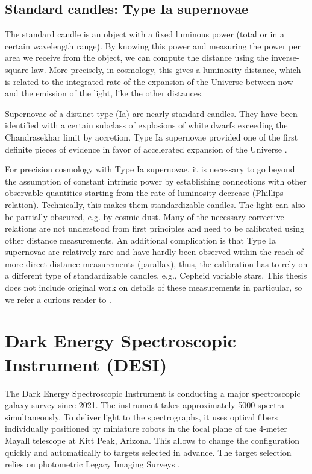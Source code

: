 \subsection{Standard candles: Type Ia supernovae}

The standard candle is an object with a fixed luminous power (total or in a certain wavelength range).
By knowing this power and measuring the power per area we receive from the object, we can compute the distance using the inverse-square law.
More precisely, in cosmology, this gives a luminosity distance, which is related to the integrated rate of the expansion of the Universe between now and the emission of the light, like the other distances.

Supernovae of a distinct type (Ia) are nearly standard candles.
They have been identified with a certain subclass of explosions of white dwarfs exceeding the Chandrasekhar limit by accretion.
Type Ia supernovae provided one of the first definite pieces of evidence in favor of accelerated expansion of the Universe \citep{accelerated-expansion-perlmutter-et-al,accelerated-expansion-riess-et-al}.

For precision cosmology with Type Ia supernovae, it is necessary to go beyond the assumption of constant intrinsic power by establishing connections with other observable quantities starting from the rate of luminosity decrease (Phillips relation).
Technically, this makes them standardizable candles.
The light can also be partially obscured, e.g. by cosmic dust.
Many of the necessary corrective relations are not understood from first principles and need to be calibrated using other distance measurements.
An additional complication is that Type Ia supernovae are relatively rare and have hardly been observed within the reach of more direct distance measurements (parallax), thus, the calibration has to rely on a different type of standardizable candles, e.g., Cepheid variable stars.
This thesis does not include original work on details of these measurements in particular, so we refer a curious reader to \cite{SH0ES-2022,CCHP-status-report-Freedman,PantheonPlus-cosmo,Union3,DES-Y5-SN-cosmo}.

\section{Dark Energy Spectroscopic Instrument (DESI)}

The Dark Energy Spectroscopic Instrument \citep[DESI,][]{DESI2016a.Science} is conducting a major spectroscopic galaxy survey since 2021.
The instrument \citep{DESI2016b.Instr,DESI2022.KP1.Instr} takes approximately 5000 spectra simultaneously.
To deliver light to the spectrographs, it uses optical fibers individually positioned by miniature robots in the focal plane of the 4-meter Mayall telescope at Kitt Peak, Arizona.
This allows to change the configuration quickly and automatically to targets selected in advance.
The target selection relies on photometric Legacy Imaging Surveys \citep{LS.Overview.Dey.2019}.

